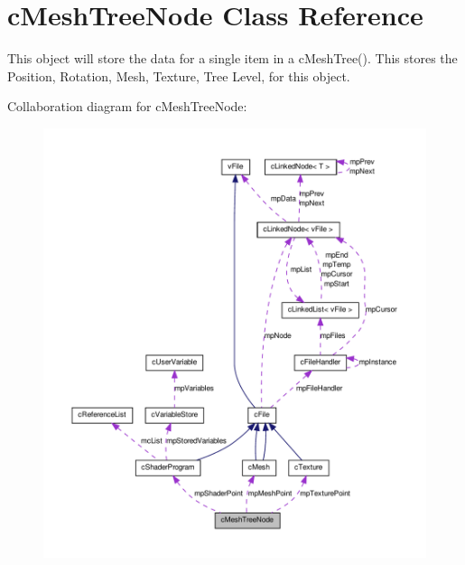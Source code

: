 \hypertarget{classc_mesh_tree_node}{
\section{cMeshTreeNode Class Reference}
\label{classc_mesh_tree_node}
}


This object will store the data for a single item in a cMeshTree(). This stores the Position, Rotation, Mesh, Texture, Tree Level, for this object.  




Collaboration diagram for cMeshTreeNode:\nopagebreak
\begin{figure}[H]
\begin{center}
\leavevmode
\includegraphics[width=400pt]{classc_mesh_tree_node__coll__graph}
\end{center}
\end{figure}
